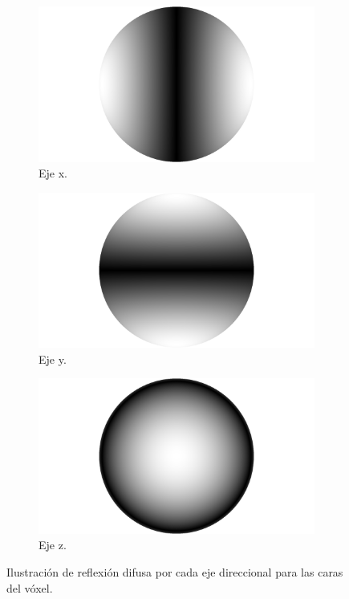 \begin{figure}[H]
	\centering
	\begin{subfigure}[t]{0.33\textwidth}
		\centering
		\captionsetup{justification=centering}
		\includegraphics[width=\linewidth]{media/lambert_right.png}
		\caption*{Eje x.}
	\end{subfigure}%
	\begin{subfigure}[t]{0.33\textwidth}
		\centering
		\captionsetup{justification=centering}
		\includegraphics[width=\linewidth]{media/lambert_up.png}
		\caption*{Eje y.}
	\end{subfigure}%
	\begin{subfigure}[t]{0.33\textwidth}
		\centering
		\captionsetup{justification=centering}
		\includegraphics[width=\linewidth]{media/lambert_forward.png}
		\caption*{Eje z.}
	\end{subfigure}%
	\caption{Ilustración de reflexión difusa por cada eje direccional para las caras del vóxel.}
	\label{fig:lambert_dir}
\end{figure}


